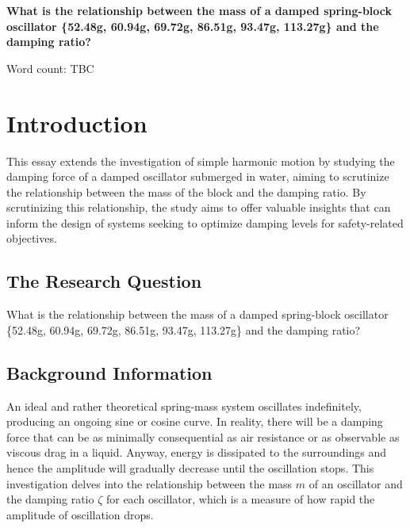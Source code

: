 \documentclass[a4paper,12pt]{article}
\begin{document}
\pagestyle{fancy}


\begin{titlepage}
  \begin{center}
    \vspace*{3cm}

    {\textbf{\Large{What is the relationship between the mass of a damped spring-block oscillator \{52.48g, 60.94g, 69.72g, 86.51g, 93.47g, 113.27g\} and the damping ratio?}}}



    \vspace{4cm}

    Word count: TBC

  \end{center}
\end{titlepage}
\pagebreak
\tableofcontents
\pagebreak

\clearpage
\setcounter{page}{1}

\section{Introduction}
This essay extends the investigation of simple harmonic motion by studying the damping force of a damped oscillator submerged in water, aiming to scrutinize the relationship between the mass of the block and the damping ratio. By scrutinizing this relationship, the study aims to offer valuable insights that can inform the design of systems seeking to optimize damping levels for safety-related objectives.


\subsection{The Research Question}
What is the relationship between the mass of a damped spring-block oscillator \{52.48g, 60.94g, 69.72g, 86.51g, 93.47g, 113.27g\} and the damping ratio?

\subsection{Background Information}
An ideal and rather theoretical spring-mass system oscillates indefinitely, producing an ongoing sine or cosine curve. In reality, there will be a damping force that can be as minimally consequential as air resistance or as observable as viscous drag in a liquid. Anyway, energy is dissipated to the surroundings and hence the amplitude will gradually decrease until the oscillation stops. This investigation delves into the relationship between the mass $m$ of an oscillator and the damping ratio $\zeta$ for each oscillator, which is a measure of how rapid the amplitude of oscillation drops.
\end{document}
